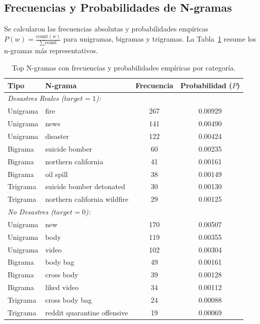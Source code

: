 \documentclass[11pt,a4paper]{article}
\begin{document}
\subsection{Frecuencias y Probabilidades de N-gramas}
Se calcularon las frecuencias absolutas y probabilidades empíricas $P(w) = \frac{\text{count}(w)}{\sum \text{count}}$ para unigramas, bigramas y trigramas. La Tabla~\ref{tab:ngram_probs} resume los n-gramas más representativos.

\begin{table}[H]
\centering
\small
\caption{Top N-gramas con frecuencias y probabilidades empíricas por categoría.}
\label{tab:ngram_probs}
\begin{tabular}{llcc}
\toprule
\textbf{Tipo} & \textbf{N-grama} & \textbf{Frecuencia} & \textbf{Probabilidad ($P$)} \\
\midrule
\multicolumn{4}{l}{\textit{Desastres Reales ($target = 1$):}} \\
Unigrama & fire & 267 & 0.00929 \\
Unigrama & news & 141 & 0.00490 \\
Unigrama & disaster & 122 & 0.00424 \\
Bigrama & suicide bomber & 60 & 0.00235 \\
Bigrama & northern california & 41 & 0.00161 \\
Bigrama & oil spill & 38 & 0.00149 \\
Trigrama & suicide bomber detonated & 30 & 0.00130 \\
Trigrama & northern california wildfire & 29 & 0.00125 \\
\midrule
\multicolumn{4}{l}{\textit{No Desastres ($target = 0$):}} \\
Unigrama & new & 170 & 0.00507 \\
Unigrama & body & 119 & 0.00355 \\
Unigrama & video & 102 & 0.00304 \\
Bigrama & body bag & 49 & 0.00161 \\
Bigrama & cross body & 39 & 0.00128 \\
Bigrama & liked video & 34 & 0.00112 \\
Trigrama & cross body bag & 24 & 0.00088 \\
Trigrama & reddit quarantine offensive & 19 & 0.00069 \\
\bottomrule
\end{tabular}
\end{table}
\end{document}
